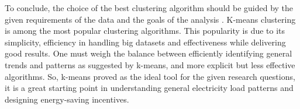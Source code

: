 To conclude, the choice of the best clustering algorithm should be guided by the given requirements of the data and the goals of the analysis \cite{COL-ALT}.
K-means clustering is among the most popular clustering algorithms.
This popularity is due to its simplicity, efficiency in handling big datasets and effectiveness while delivering good results.
One must weigh the balance between efficiently identifying general trends and patterns as suggested by k-means, and more explicit but less effective algorithms.
So, k-means proved as the ideal tool for the given research questions, it is a great starting point in understanding general electricity load patterns and designing energy-saving incentives.

